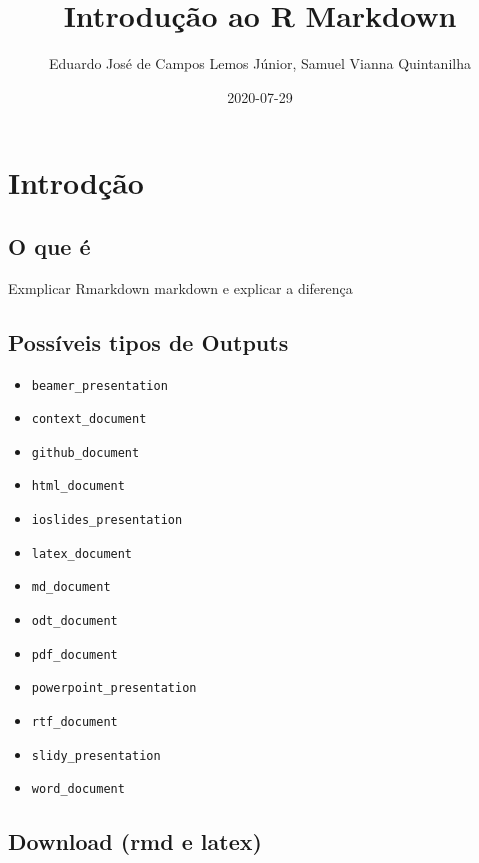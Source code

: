 \documentclass[
]{book}
\title{Introdução ao R Markdown}
\author{Eduardo José de Campos Lemos Júnior, Samuel Vianna Quintanilha}
\date{2020-07-29}
\providecommand{\tightlist}{%
  \setlength{\itemsep}{0pt}\setlength{\parskip}{0pt}}
\begin{document}
\maketitle

{
\setcounter{tocdepth}{1}
\tableofcontents
}
\hypertarget{intro}{%
\chapter{Introdção}\label{intro}}

\hypertarget{o-que-uxe9}{%
\section{O que é}\label{o-que-uxe9}}

Exmplicar Rmarkdown markdown e explicar a diferença

\hypertarget{possuxedveis-tipos-de-outputs}{%
\section{Possíveis tipos de Outputs}\label{possuxedveis-tipos-de-outputs}}

\begin{itemize}
\tightlist
\item
  \texttt{beamer\_presentation}
\item
  \texttt{context\_document}
\item
  \texttt{github\_document}
\item
  \texttt{html\_document}
\item
  \texttt{ioslides\_presentation}
\item
  \texttt{latex\_document}
\item
  \texttt{md\_document}
\item
  \texttt{odt\_document}
\item
  \texttt{pdf\_document}
\item
  \texttt{powerpoint\_presentation}
\item
  \texttt{rtf\_document}
\item
  \texttt{slidy\_presentation}
\item
  \texttt{word\_document}
\end{itemize}

\hypertarget{download-rmd-e-latex}{%
\section{Download (rmd e latex)}\label{download-rmd-e-latex}}
\end{document}
